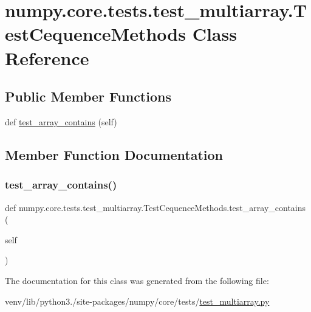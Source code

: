 \hypertarget{classnumpy_1_1core_1_1tests_1_1test__multiarray_1_1TestCequenceMethods}{}\section{numpy.\+core.\+tests.\+test\+\_\+multiarray.\+Test\+Cequence\+Methods Class Reference}
\label{classnumpy_1_1core_1_1tests_1_1test__multiarray_1_1TestCequenceMethods}
\subsection*{Public Member Functions}
\begin{DoxyCompactItemize}
\item 
def \hyperlink{classnumpy_1_1core_1_1tests_1_1test__multiarray_1_1TestCequenceMethods_a2a3bc8ddb44fd8a504c1ebc7ed9a6fb7}{test\+\_\+array\+\_\+contains} (self)
\end{DoxyCompactItemize}


\subsection{Member Function Documentation}
\mbox{\label{classnumpy_1_1core_1_1tests_1_1test__multiarray_1_1TestCequenceMethods_a2a3bc8ddb44fd8a504c1ebc7ed9a6fb7}} 
\subsubsection{\texorpdfstring{test\+\_\+array\+\_\+contains()}{test\_array\_contains()}}
{\footnotesize\ttfamily def numpy.\+core.\+tests.\+test\+\_\+multiarray.\+Test\+Cequence\+Methods.\+test\+\_\+array\+\_\+contains (\begin{DoxyParamCaption}\item[{}]{self }\end{DoxyParamCaption})}



The documentation for this class was generated from the following file\+:\begin{DoxyCompactItemize}
\item 
venv/lib/python3./site-\/packages/numpy/core/tests/\hyperlink{core_2tests_2test__multiarray_8py}{test\+\_\+multiarray.\+py}\end{DoxyCompactItemize}
